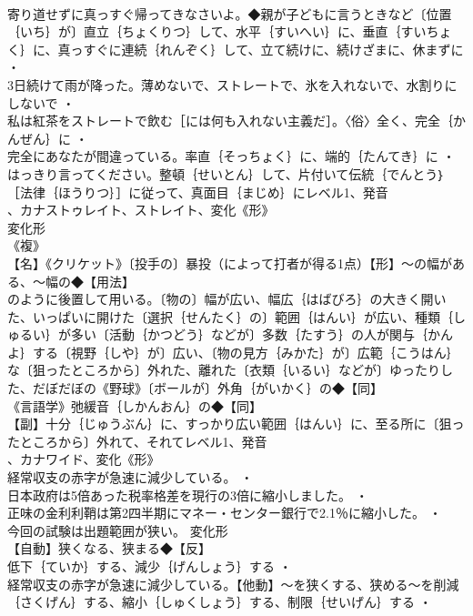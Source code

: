 \documentclass[8pt]{extreport}
\begin{document}
\begin{CJK}{UTF8}{min}
\\	寄り道せずに真っすぐ帰ってきなさいよ。◆親が子どもに言うときなど〔位置｛いち｝が〕直立｛ちょくりつ｝して、水平｛すいへい｝に、垂直｛すいちょく｝に、真っすぐに連続｛れんぞく｝して、立て続けに、続けざまに、休まずに ・
\\	3日続けて雨が降った。薄めないで、ストレートで、氷を入れないで、水割りにしないで ・
\\	私は紅茶をストレートで飲む［には何も入れない主義だ］。〈俗〉全く、完全｛かんぜん｝に ・
\\	完全にあなたが間違っている。率直｛そっちょく｝に、端的｛たんてき｝に ・
\\	はっきり言ってください。整頓｛せいとん｝して、片付いて伝統｛でんとう｝［法律｛ほうりつ｝］に従って、真面目｛まじめ｝にレベル1、発音
\\	、カナストゥレイト、ストレイト、変化《形》
\\	変化形 
\\	《複》
\\	【名】《クリケット》〔投手の〕暴投（によって打者が得る1点）【形】～の幅がある、～幅の◆【用法】
\\	のように後置して用いる。〔物の〕幅が広い、幅広｛はばびろ｝の大きく開いた、いっぱいに開けた〔選択｛せんたく｝の〕範囲｛はんい｝が広い、種類｛しゅるい｝が多い〔活動｛かつどう｝などが〕多数｛たすう｝の人が関与｛かんよ｝する〔視野｛しや｝が〕広い、〔物の見方｛みかた｝が〕広範｛こうはん｝な〔狙ったところから〕外れた、離れた〔衣類｛いるい｝などが〕ゆったりした、だぼだぼの《野球》〔ボールが〕外角｛がいかく｝の◆【同】
\\	《言語学》弛緩音｛しかんおん｝の◆【同】
\\	【副】十分｛じゅうぶん｝に、すっかり広い範囲｛はんい｝に、至る所に〔狙ったところから〕外れて、それてレベル1、発音
\\	、カナワイド、変化《形》
\\	経常収支の赤字が急速に減少している。 ・
\\	日本政府は5倍あった税率格差を現行の3倍に縮小しました。 ・
\\	正味の金利利鞘は第2四半期にマネー・センター銀行で2.1％に縮小した。 ・
\\	今回の試験は出題範囲が狭い。	変化形 
\\	【自動】狭くなる、狭まる◆【反】
\\	低下｛ていか｝する、減少｛げんしょう｝する ・
\\	経常収支の赤字が急速に減少している。【他動】～を狭くする、狭める～を削減｛さくげん｝する、縮小｛しゅくしょう｝する、制限｛せいげん｝する ・

\end{CJK}
\end{document}
